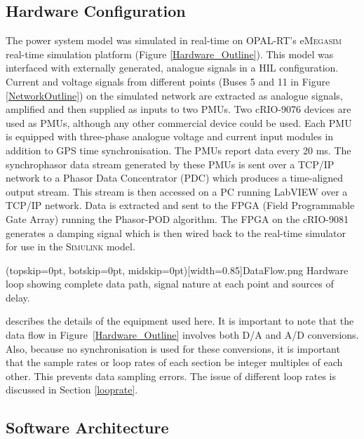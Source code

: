 \documentclass{ieeeaccess}
\begin{document}
\subsection{Hardware Configuration}
The power system model was simulated in real-time on OPAL-RT's e\textsc{Megasim} \cite{eMEGASIM} real-time simulation platform (Figure \ref {Hardware_Outline}). This model was interfaced with externally generated, analogue signals in a HIL configuration. Current and voltage signals from different points (Buses 5 and 11 in Figure \ref{NetworkOutline}) on the simulated network are extracted as analogue signals, amplified and then supplied as inputs to two PMUs. Two cRIO-9076 \cite{cRIO9081} devices are used as PMUs, although any other commercial device could be used. Each PMU is equipped with three-phase analogue voltage and current input modules in addition to GPS time synchronisation. The PMUs report data every 20 ms. The synchrophasor data stream  generated by these PMUs is sent over a TCP/IP network to a Phasor Data Concentrator (PDC) which produces a time-aligned output stream. This stream is then accessed on a PC running LabVIEW over a TCP/IP network. Data is extracted and sent to the FPGA (Field Programmable Gate Array) running the Phasor-POD algorithm. The FPGA on the cRIO-9081 \cite{cRIO9081} generates a damping signal which is then wired back to the real-time simulator for use in the \textsc{Simulink} model.


\Figure[tbp!](topskip=0pt, botskip=0pt, midskip=0pt)[width=0.85\textwidth]{DataFlow.png}
{Hardware loop showing complete data path, signal nature at each point and sources of delay.\label{Hardware_Outline}}


\cite{PhasorPODImplement} describes the details of the equipment used here. It is important to note that the data flow in Figure~\ref{Hardware_Outline} involves both D/A and A/D conversions. Also, because no synchronisation is used for these conversions, it is important that the sample rates or loop rates of each section be integer multiples of each other. This prevents data sampling errors. The issue of different loop rates is discussed in Section \ref{looprate}.

\subsection{Software Architecture}
\end{document}
